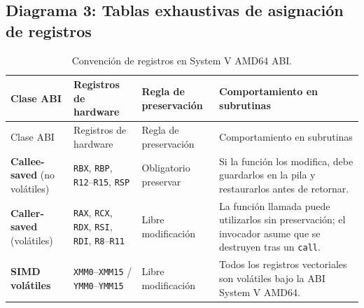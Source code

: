 \documentclass[journal]{IEEEtran}
\begin{document}
\clearpage
\subsection{Diagrama 3: Tablas exhaustivas de asignación de registros}

\begingroup
\scriptsize
\setlength{\tabcolsep}{3pt}
\renewcommand{\arraystretch}{1.18}

\begin{longtable}{@{}>{\raggedright\arraybackslash}p{}
  >{\raggedright\arraybackslash}p{}
  >{\raggedright\arraybackslash}p{}
  >{\raggedright\arraybackslash}p{}@{}}
\caption{Convención de registros en System V AMD64 ABI.}
\label{tab:abi-register-convention}\\
\toprule
Clase ABI & Registros de hardware & Regla de preservación &
Comportamiento en subrutinas \\
\midrule
\endfirsthead
\toprule
Clase ABI & Registros de hardware & Regla de preservación &
Comportamiento en subrutinas \\
\midrule
\endhead
\bottomrule
\endfoot
\textbf{Callee-saved} (no volátiles) &
  \texttt{RBX}, \texttt{RBP}, \texttt{R12}--\texttt{R15}, \texttt{RSP} &
  Obligatorio preservar & Si la función los modifica, debe guardarlos en la
  pila y restaurarlos antes de retornar. \\
\textbf{Caller-saved} (volátiles) &
  \texttt{RAX}, \texttt{RCX}, \texttt{RDX}, \texttt{RSI}, \texttt{RDI},
  \texttt{R8}--\texttt{R11} & Libre modificación & La función llamada puede
  utilizarlos sin preservación; el invocador asume que se destruyen tras un
  \texttt{call}. \\
\textbf{SIMD volátiles} &
  \texttt{XMM0}--\texttt{XMM15} / \texttt{YMM0}--\texttt{YMM15} &
  Libre modificación & Todos los registros vectoriales son volátiles bajo la
  ABI System V AMD64. \\
\end{longtable}
\end{document}
